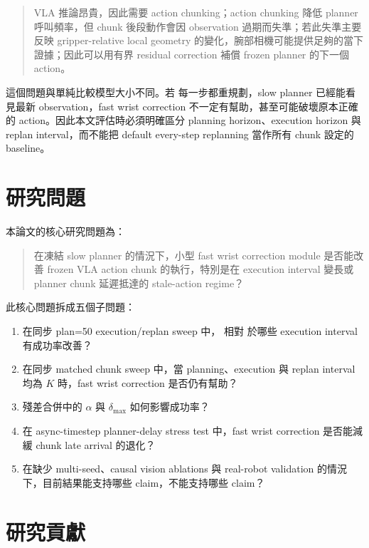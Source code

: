 \begin{quote}
VLA 推論昂貴，因此需要 action chunking；action chunking 降低 planner 呼叫頻率，但 chunk 後段動作會因 observation 過期而失準；若此失準主要反映 gripper-relative local geometry 的變化，腕部相機可能提供足夠的當下證據；因此可以用有界 residual correction 補償 frozen planner 的下一個 action。
\end{quote}

這個問題與單純比較模型大小不同。若 \smolvla{} 每一步都重規劃，slow planner 已經能看見最新 observation，fast wrist correction 不一定有幫助，甚至可能破壞原本正確的 action。因此本文評估時必須明確區分 planning horizon、execution horizon 與 replan interval，而不能把 default every-step replanning 當作所有 chunk 設定的 baseline。

\section{研究問題}

本論文的核心研究問題為：

\begin{quote}
在凍結 \smolvla{} slow planner 的情況下，小型 fast wrist correction module 是否能改善 frozen VLA action chunk 的執行，特別是在 execution interval 變長或 planner chunk 延遲抵達的 stale-action regime？
\end{quote}

此核心問題拆成五個子問題：

\begin{enumerate}
  \item 在同步 plan=50 execution/replan sweep 中，\method{} 相對 \smolvla{} 於哪些 execution interval 有成功率改善？
  \item 在同步 matched chunk sweep 中，當 planning、execution 與 replan interval 均為 $K$ 時，fast wrist correction 是否仍有幫助？
  \item 殘差合併中的 $\alpha$ 與 $\delta_{\max}$ 如何影響成功率？
  \item 在 async-timestep planner-delay stress test 中，fast wrist correction 是否能減緩 chunk late arrival 的退化？
  \item 在缺少 multi-seed、causal vision ablations 與 real-robot validation 的情況下，目前結果能支持哪些 claim，不能支持哪些 claim？
\end{enumerate}

\section{研究貢獻}

